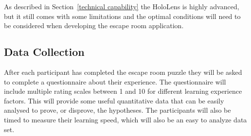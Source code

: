 \documentclass[journal]{IEEEtran}
\begin{document}
As described in Section~\ref{technical capability} the HoloLens is highly advanced, but it still comes with some limitations and the optimal conditions will need to be considered when developing the escape room application.  

\subsection{Data Collection}
After each participant has completed the escape room puzzle they will be asked to complete a questionnaire about their experience. The questionnaire will include multiple rating scales between 1 and 10 for different learning experience factors. This will provide some useful quantitative data that can be easily analysed to prove, or disprove, the hypotheses.
The participants will also be timed to measure their learning speed, which will also be an easy to analyze data set. 







\end{document}
